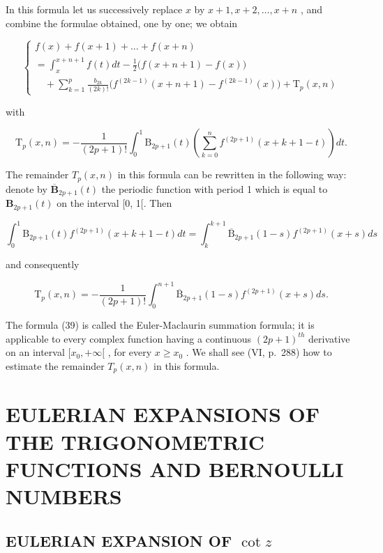 In this formula let us successively replace \(x\) by \(x + 1, x + 2, \ldots, x + n\) , and combine the formulae obtained, one by one; we obtain

\[
\left\{ \begin{array}{l} f (x) + f (x + 1) + \dots + f (x + n) \\ = \int_ {x} ^ {x + n + 1} f (t) d t - \frac {1}{2} \bigl (f (x + n + 1) - f (x) \bigr) \\ \quad + \sum_ {k = 1} ^ {p} \frac {b _ {2 k}}{(2 k) !} \bigl (f ^ {(2 k - 1)} (x + n + 1) - f ^ {(2 k - 1)} (x) \bigr) + \mathrm{T} _ {p} (x, n) \end{array} \right.\tag{39}
\]

with

\[
\mathrm{T} _ {p} (x, n) = - \frac {1}{(2 p + 1) !} \int_ {0} ^ {1} \mathrm{B} _ {2 p + 1} (t) \left(\sum_ {k = 0} ^ {n} f ^ {(2 p + 1)} (x + k + 1 - t)\right) d t.\tag{40}
\]

The remainder \(T_{p}(x,n)\) in this formula can be rewritten in the following way: denote by \(\overline{\mathbf{B}}_{2p+1}(t)\) the periodic function with period 1 which is equal to \(\mathbf{B}_{2p+1}(t)\) on the interval {[}0, 1{[}. Then

\[
\int_ {0} ^ {1} \mathrm{B} _ {2 p + 1} (t) f ^ {(2 p + 1)} (x + k + 1 - t) d t = \int_ {k} ^ {k + 1} \overline {{\mathrm{B}}} _ {2 p + 1} (1 - s) f ^ {(2 p + 1)} (x + s) d s
\]

and consequently

\[
\mathrm{T} _ {p} (x, n) = - \frac {1}{(2 p + 1) !} \int_ {0} ^ {n + 1} \overline {{\mathrm{B}}} _ {2 p + 1} (1 - s) f ^ {(2 p + 1)} (x + s) d s.\tag{41}
\]

The formula (39) is called the Euler-Maclaurin summation formula; it is applicable to every complex function having a continuous \((2p+1)^{th}\) derivative on an interval \([x_{0},+\infty[\) , for every \(x\geqslant x_{0}\) . We shall see (VI, p.~288) how to estimate the remainder \(T_{p}(x,n)\) in this formula.

\section{EULERIAN EXPANSIONS OF THE TRIGONOMETRIC FUNCTIONS AND BERNOULLI NUMBERS}

\subsection{\texorpdfstring{EULERIAN EXPANSION OF \(\cot z\)}{EULERIAN EXPANSION OF COT Z}}

